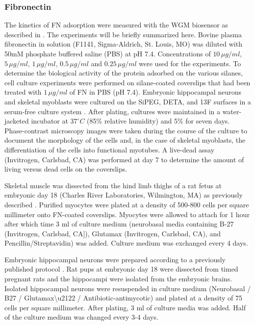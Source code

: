 \subsubsection{Fibronectin}

The kinetics of FN adsorption were measured with the WGM biosensor
as described in \cite{Wilson2011}. The experiments will be briefly
summarized here. Bovine plasma fibronectin in solution (F1141, Sigma-Aldrich,
St. Louis, MO) was diluted with 50mM phosphate buffered saline (PBS)
at pH 7.4. Concentrations of $10\,\mu g/ml$, $5\,\mu g/ml$, $1\,\mu g/ml$,
$0.5\,\mu g/ml$ and $0.25\,\mu g/ml$ were used for the experiments.
To determine the biological activity of the protein adsorbed on the
various silanes, cell culture experiments were performed on silane-coated
coverslips that had been treated with $1\,\mu g/ml$ of FN in PBS
(pH 7.4). Embryonic hippocampal neurons and skeletal myoblasts were
cultured on the SiPEG, DETA, and 13F surfaces in a serum-free culture
system \cite{Brewer1995,Das2007}. After plating, cultures were maintained
in a water-jacketed incubator at $37^{\circ}C$ (85\% relative humidity)
and 5\%  for seven days. Phase-contrast microscopy
images were taken during the course of the culture to document the
morphology of the cells and, in the case of skeletal myoblasts, the
differentiation of the cells into functional myotubes. A live-dead
assay (Invitrogen, Carlsbad, CA) was performed at day 7 to determine
the amount of living versus dead cells on the coverslips.

Skeletal muscle was dissected from the hind limb thighs of a rat fetus
at embryonic day 18 (Charles River Laboratories, Wilmington, MA) as
previously described \cite{Wilson2011}. Purified myocytes were plated
at a density of 500-800 cells per square millimeter onto FN-coated
coverslips. Myocytes were allowed to attach for 1 hour after which
time 3 ml of culture medium (neurobasal media containing B-27 (Invitrogen,
Carlsbad, CA{]}), Glutamax (Invitrogen, Carlsbad, CA), and Pencillin/Streptavidin)
was added. Culture medium was exchanged every 4 days. 

Embryonic hippocampal neurons were prepared according to a previously
published protocol \cite{Wilson2011}. Rat pups at embryonic day 18
were dissected from timed pregnant rats and the hippocampi were isolated
from the embryonic brains. Isolated hippocampal neurons were resuspended
in culture medium (Neurobasal / B27 / Glutamax\textbackslash{}u2122
/ Antibiotic-antimycotic) and plated at a density of 75 cells per
square millimeter. After plating, 3 ml of culture media was added.
Half of the culture medium was changed every 3-4 days. 


